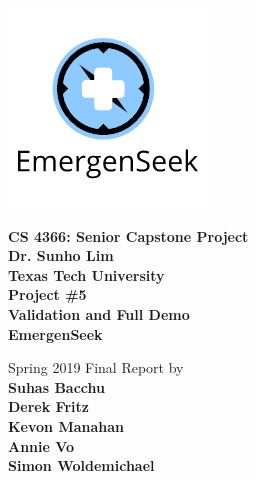 \documentclass[10pt, a4paper]{article}
\begin{document}
\begin{titlepage}
	\begin{center}
		\begin{Large}
		
		\vspace*{4cm}
		\centerline{ 	
 			\includegraphics[scale=.9]{logo.png}
		}
		\textbf{CS 4366: Senior Capstone Project \\ Dr. Sunho Lim \\ Texas Tech University \\ Project \#5 \\ Validation and Full Demo \\ EmergenSeek}
 
		\vspace{0.5cm}
		Spring 2019 Final Report 
		\linebreak
 		by \\
		\textbf{Suhas Bacchu \\ Derek Fritz \\ Kevon Manahan \\ Annie Vo \\ Simon Woldemichael}
 
		\newpage
 		\end{Large}
	\end{center}
\end{titlepage}
\end{document}
